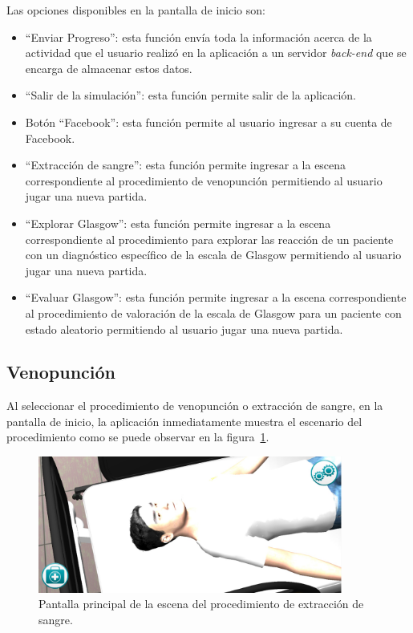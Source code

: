 Las opciones disponibles en la pantalla de inicio son:

\begin{itemize}
\item \enquote{Enviar Progreso}: esta función envía toda la información
    acerca de la actividad que el usuario realizó en la aplicación a un servidor
    \emph{back-end} que se encarga de almacenar estos datos.
\item \enquote{Salir de la simulación}: esta función permite salir de la
    aplicación.
\item Botón \enquote{Facebook}: esta función permite al usuario ingresar a su
    cuenta de Facebook.
\item \enquote{Extracción de sangre}: esta función permite ingresar a la
    escena correspondiente al procedimiento de venopunción 
    permitiendo al usuario jugar una nueva partida.
\item \enquote{Explorar Glasgow}: esta función permite ingresar a la
    escena correspondiente al procedimiento para explorar las reacción de un
    paciente con un diagnóstico específico de la escala de Glasgow permitiendo
    al usuario jugar una nueva partida.
\item \enquote{Evaluar Glasgow}: esta función permite ingresar a la escena
    correspondiente al procedimiento de valoración de la
    escala de Glasgow para un paciente con estado aleatorio permitiendo al
    usuario jugar una nueva partida.
\end{itemize}


\subsection{Venopunción}

Al seleccionar el procedimiento de venopunción o extracción de sangre, en la pantalla de inicio,  
la aplicación inmediatamente muestra el escenario del procedimiento como se puede 
observar en la figura~\ref{fig:hemocultivo_principal}. 

\begin{figure}[H] 
\centering 
\includegraphics[width=10cm]{solucion/images/hemocultivo_principal.jpg}
\caption{Pantalla principal de la escena del procedimiento de extracción de sangre.}
\label{fig:hemocultivo_principal}
\end{figure}

